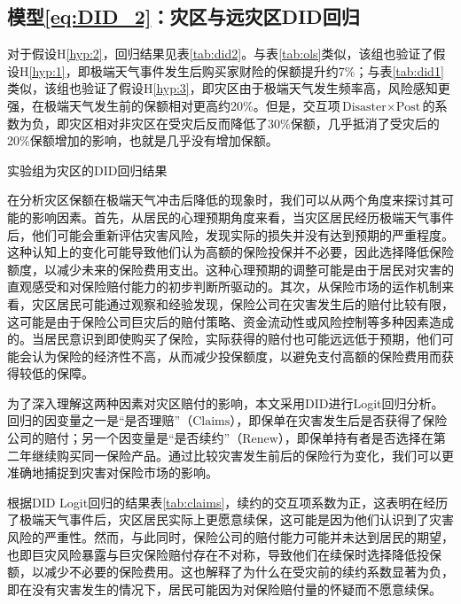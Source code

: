 \subsection{模型\ref{eq:DID_2}：灾区与远灾区DID回归}
对于假设H\ref{hyp:2}，回归结果见表\ref{tab:did2}。与表\ref{tab:ols}类似，该组也验证了假设H\ref{hyp:1}，即极端天气事件发生后购买家财险的保额提升约7\%；与表\ref{tab:did1}类似，该组也验证了假设H\ref{hyp:3}，即灾区由于极端天气发生频率高，风险感知更强，在极端天气发生前的保额相对更高约20\%。但是，交互项$\text{Disaster}\times \text{Post}$的系数为负，即灾区相对非灾区在受灾后反而降低了30\%保额，几乎抵消了受灾后的20\%保额增加的影响，也就是几乎没有增加保额。
\begin{table}[H]
    \centering
    \caption{实验组为灾区的DID回归结果}\label{tab:did2}
    
\end{table}

在分析灾区保额在极端天气冲击后降低的现象时，我们可以从两个角度来探讨其可能的影响因素。首先，从居民的心理预期角度来看，当灾区居民经历极端天气事件后，他们可能会重新评估灾害风险，发现实际的损失并没有达到预期的严重程度。这种认知上的变化可能导致他们认为高额的保险投保并不必要，因此选择降低保险额度，以减少未来的保险费用支出。这种心理预期的调整可能是由于居民对灾害的直观感受和对保险赔付能力的初步判断所驱动的。其次，从保险市场的运作机制来看，灾区居民可能通过观察和经验发现，保险公司在灾害发生后的赔付比较有限，这可能是由于保险公司巨灾后的赔付策略、资金流动性或风险控制等多种因素造成的\citep{田玲2009中国财产保险业巨灾损失赔付能力实证研究}。当居民意识到即使购买了保险，实际获得的赔付也可能远远低于预期，他们可能会认为保险的经济性不高，从而减少投保额度，以避免支付高额的保险费用而获得较低的保障。

为了深入理解这两种因素对灾区赔付的影响，本文采用DID进行Logit回归分析。回归的因变量之一是“是否理赔”（$\text{Claims}$），即保单在灾害发生后是否获得了保险公司的赔付；另一个因变量是“是否续约”（$\text{Renew}$），即保单持有者是否选择在第二年继续购买同一保险产品。通过比较灾害发生前后的保险行为变化，我们可以更准确地捕捉到灾害对保险市场的影响。

根据DID Logit回归的结果表\ref{tab:claims}，续约的交互项系数为正，这表明在经历了极端天气事件后，灾区居民实际上更愿意续保，这可能是因为他们认识到了灾害风险的严重性。然而，与此同时，保险公司的赔付能力可能并未达到居民的期望，也即巨灾风险暴露与巨灾保险赔付存在不对称\citep{张旭升2010中国巨灾风险暴露与巨灾保险赔付不对称实证}，导致他们在续保时选择降低投保额，以减少不必要的保险费用。这也解释了为什么在受灾前的续约系数显著为负，即在没有灾害发生的情况下，居民可能因为对保险赔付量的怀疑而不愿意续保。

